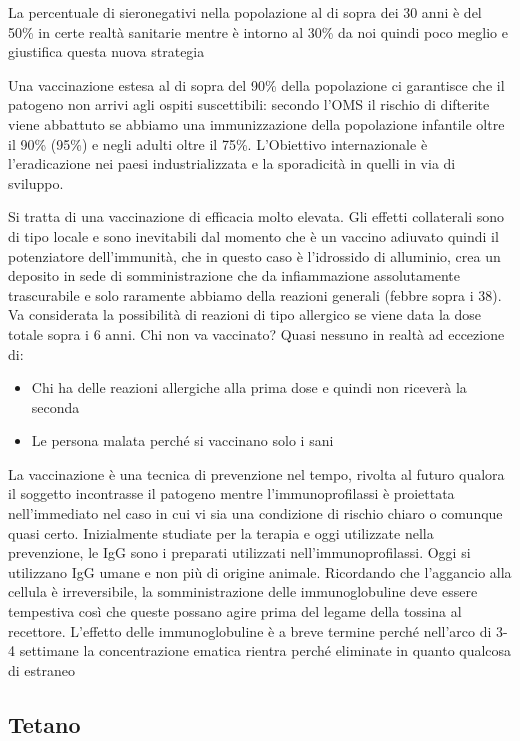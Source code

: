  La percentuale di sieronegativi nella popolazione al di sopra dei 30
  anni è del 50\% in certe realtà sanitarie mentre è intorno al 30\% da
  noi quindi poco meglio e giustifica questa nuova strategia

  Una vaccinazione estesa al di sopra del 90\% della popolazione ci
  garantisce che il patogeno non arrivi agli ospiti suscettibili:
  secondo l'OMS il rischio di difterite viene abbattuto se abbiamo una
  immunizzazione della popolazione infantile oltre il 90\% (95\%) e
  negli adulti oltre il 75\%. L'Obiettivo internazionale è
  l'eradicazione nei paesi industrializzata e la sporadicità in quelli
  in via di sviluppo.

  Si tratta di una vaccinazione di efficacia molto elevata. Gli effetti
  collaterali sono di tipo locale e sono inevitabili dal momento che è
  un vaccino adiuvato quindi il potenziatore dell'immunità, che in
  questo caso è l'idrossido di alluminio, crea un deposito in sede di
  somministrazione che da infiammazione assolutamente trascurabile e
  solo raramente abbiamo della reazioni generali (febbre sopra i 38). Va
  considerata la possibilità di reazioni di tipo allergico se viene data
  la dose totale sopra i 6 anni. Chi non va vaccinato? Quasi nessuno in
  realtà ad eccezione di:

\begin{itemize}
\item
  Chi ha delle reazioni allergiche alla prima dose e quindi non riceverà
  la seconda
\item
  Le persona malata perché si vaccinano solo i sani
\end{itemize}

  La vaccinazione è una tecnica di prevenzione nel tempo, rivolta al
  futuro qualora il soggetto incontrasse il patogeno mentre
  l'immunoprofilassi è proiettata nell'immediato nel caso in cui vi sia
  una condizione di rischio chiaro o comunque quasi certo. Inizialmente
  studiate per la terapia e oggi utilizzate nella prevenzione, le IgG
  sono i preparati utilizzati nell'immunoprofilassi. Oggi si utilizzano
  IgG umane e non più di origine animale. Ricordando che l'aggancio alla
  cellula è irreversibile, la somministrazione delle immunoglobuline
  deve essere tempestiva così che queste possano agire prima del legame
  della tossina al recettore. L'effetto delle immunoglobuline è a breve
  termine perché nell'arco di 3-4 settimane la concentrazione ematica
  rientra perché eliminate in quanto qualcosa di estraneo

\subsection{Tetano}

